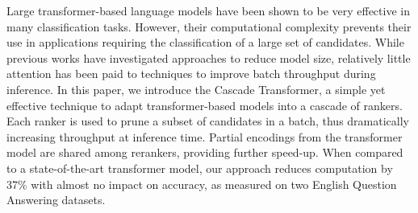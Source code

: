 Large transformer-based language models have been shown to be very effective in many classification tasks. However, their computational complexity prevents their use in applications requiring the classification of a large set of candidates. While previous works have investigated approaches to reduce model size, relatively little attention has been paid to techniques to improve batch throughput during inference. In this paper, we introduce the Cascade Transformer, a simple yet effective technique to adapt transformer-based models into a cascade of rankers. Each ranker is used to prune a subset of candidates in a batch, thus dramatically increasing throughput at inference time. Partial encodings from the transformer model are shared among rerankers, providing further speed-up. When compared to a state-of-the-art transformer model, our approach reduces computation by 37\% with almost no impact on accuracy, as measured on two English Question Answering datasets.
